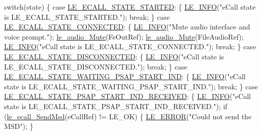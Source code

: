 \begin{DoxyCodeInclude}
{{{{{{{{    \textcolor{keywordflow}{switch}(state)
    \{
        \textcolor{keywordflow}{case} \hyperlink{le__ecall__interface_8h_a233609e4724e549a1405f9177c0a07dda94ba7aacca9dfe74c4733515a7ba2c5e}{LE\_ECALL\_STATE\_STARTED}:
        \{
            \hyperlink{le__log_8h_a23e6d206faa64f612045d688cdde5808}{LE\_INFO}(\textcolor{stringliteral}{"eCall state is LE\_ECALL\_STATE\_STARTED."});
            \textcolor{keywordflow}{break};
        \}
        \textcolor{keywordflow}{case} \hyperlink{le__ecall__interface_8h_a233609e4724e549a1405f9177c0a07dda974a4cdcc060be69502b2eae59962a45}{LE\_ECALL\_STATE\_CONNECTED}:
        \{
            \hyperlink{le__log_8h_a23e6d206faa64f612045d688cdde5808}{LE\_INFO}(\textcolor{stringliteral}{"Mute audio interface and voice prompt."});
            \hyperlink{le__audio__interface_8h_a147e97c49dbc003f63df78f97d5fca32}{le\_audio\_Mute}(FeOutRef);
            \hyperlink{le__audio__interface_8h_a147e97c49dbc003f63df78f97d5fca32}{le\_audio\_Mute}(FileAudioRef);
            \hyperlink{le__log_8h_a23e6d206faa64f612045d688cdde5808}{LE\_INFO}(\textcolor{stringliteral}{"eCall state is LE\_ECALL\_STATE\_CONNECTED."});
            \textcolor{keywordflow}{break};
        \}
        \textcolor{keywordflow}{case} \hyperlink{le__ecall__interface_8h_a233609e4724e549a1405f9177c0a07dda085024eb3cca6b48f024f368c6b0f757}{LE\_ECALL\_STATE\_DISCONNECTED}:
        \{
            \hyperlink{le__log_8h_a23e6d206faa64f612045d688cdde5808}{LE\_INFO}(\textcolor{stringliteral}{"eCall state is LE\_ECALL\_STATE\_DISCONNECTED."});
            \textcolor{keywordflow}{break};
        \}
        \textcolor{keywordflow}{case} \hyperlink{le__ecall__interface_8h_a233609e4724e549a1405f9177c0a07ddafeaa941937f098a5d6cc913f9ee2b32f}{LE\_ECALL\_STATE\_WAITING\_PSAP\_START\_IND}:
        \{
            \hyperlink{le__log_8h_a23e6d206faa64f612045d688cdde5808}{LE\_INFO}(\textcolor{stringliteral}{"eCall state is LE\_ECALL\_STATE\_WAITING\_PSAP\_START\_IND."});
            \textcolor{keywordflow}{break};
        \}
        \textcolor{keywordflow}{case} \hyperlink{le__ecall__interface_8h_a233609e4724e549a1405f9177c0a07dda2660c7eedfd850b845f0ece7899d5454}{LE\_ECALL\_STATE\_PSAP\_START\_IND\_RECEIVED}:
        \{
            \hyperlink{le__log_8h_a23e6d206faa64f612045d688cdde5808}{LE\_INFO}(\textcolor{stringliteral}{"eCall state is LE\_ECALL\_STATE\_PSAP\_START\_IND\_RECEIVED."});
            \textcolor{keywordflow}{if} (\hyperlink{le__ecall__interface_8h_a344e4c29208e576e81dda113f786529e}{le\_ecall\_SendMsd}(eCallRef) != LE\_OK)
            \{
                \hyperlink{le__log_8h_a353590f91b3143a7ba3a416ae5a50c3d}{LE\_ERROR}(\textcolor{stringliteral}{"Could not send the MSD"});
            \}

}}}}}}}}
\end{DoxyCodeInclude}
